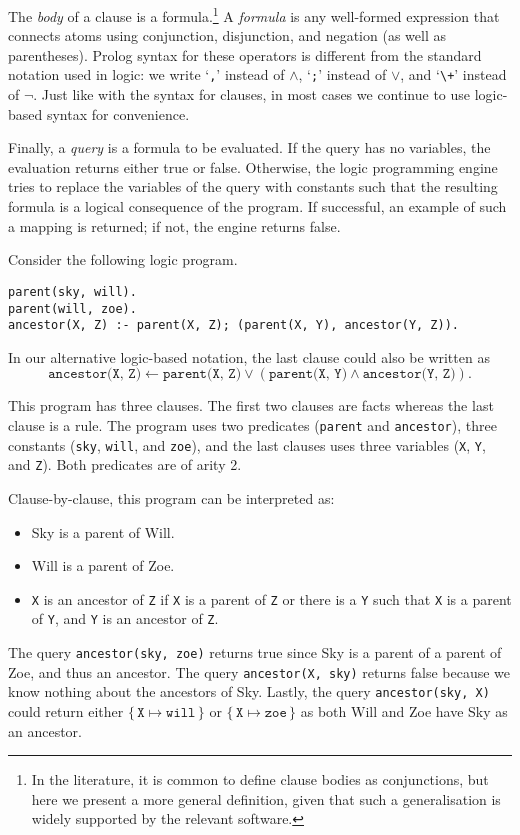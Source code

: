 The \emph{body} of a clause is a formula.\footnote{In the literature, it is common to define clause bodies as conjunctions, but here we present a more general definition, given that such a generalisation is widely supported by the relevant software.} A \emph{formula} is any well-formed expression that connects atoms using conjunction, disjunction, and negation (as well as parentheses). Prolog syntax for these operators is different from the standard notation used in logic: we write `\verb+,+' instead of $\land$, `\verb+;+' instead of $\lor$, and `\verb#\+#' instead of $\neg$. Just like with the syntax for clauses, in most cases we continue to use logic-based syntax for convenience.

Finally, a \emph{query} is a formula to be evaluated. If the query has no variables, the evaluation returns either true or false. Otherwise, the logic programming engine tries to replace the variables of the query with constants such that the resulting formula is a logical consequence of the program. If successful, an example of such a mapping is returned; if not, the engine returns false.

\begin{example}
  Consider the following logic program.
\begin{verbatim}
parent(sky, will).
parent(will, zoe).
ancestor(X, Z) :- parent(X, Z); (parent(X, Y), ancestor(Y, Z)).
\end{verbatim}
In our alternative logic-based notation, the last clause could also be written as
\[
\texttt{ancestor(X, Z)} \gets \texttt{parent(X, Z)} \lor (\texttt{parent(X, Y)} \land \texttt{ancestor(Y, Z)}).
\]

This program has three clauses. The first two clauses are facts whereas the last clause is a rule. The program uses two predicates (\texttt{parent} and \texttt{ancestor}), three constants (\texttt{sky}, \texttt{will}, and \texttt{zoe}), and the last clauses uses three variables (\texttt{X}, \texttt{Y}, and \texttt{Z}). Both predicates are of arity 2.

Clause-by-clause, this program can be interpreted as:
\begin{itemize}
\item Sky is a parent of Will.
\item Will is a parent of Zoe.
\item \texttt{X} is an ancestor of \texttt{Z} if \texttt{X} is a parent of \texttt{Z} or there is a \texttt{Y} such that \texttt{X} is a parent of \texttt{Y}, and \texttt{Y} is an ancestor of \texttt{Z}.
\end{itemize}

The query \texttt{ancestor(sky, zoe)} returns true since Sky is a parent of a parent of Zoe, and thus an ancestor. The query \texttt{ancestor(X, sky)} returns false because we know nothing about the ancestors of Sky. Lastly, the query \texttt{ancestor(sky, X)} could return either $\{\, \texttt{X} \mapsto \texttt{will} \,\}$ or $\{\, \texttt{X} \mapsto \texttt{zoe} \,\}$ as both Will and Zoe have Sky as an ancestor.
\end{example}

